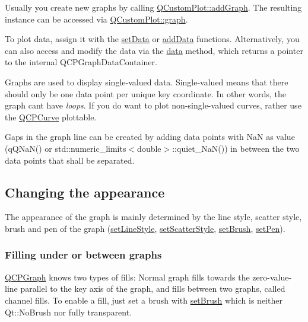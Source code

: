 Usually you create new graphs by calling \hyperlink{classQCustomPlot_a6fb2873d35a8a8089842d81a70a54167}{Q\+Custom\+Plot\+::add\+Graph}. The resulting instance can be accessed via \hyperlink{classQCustomPlot_a6ecae130f684b25276fb47bd3a5875c6}{Q\+Custom\+Plot\+::graph}.

To plot data, assign it with the \hyperlink{classQCPGraph_a1eae9429a316b008e2d99b2d65a54395}{set\+Data} or \hyperlink{classQCPGraph_ae0555c0d3fe0fa7cb8628f88158d420f}{add\+Data} functions. Alternatively, you can also access and modify the data via the \hyperlink{classQCPGraph_a141aa31a1f19bbd0ce60f55eaeb9ea60}{data} method, which returns a pointer to the internal Q\+C\+P\+Graph\+Data\+Container.

Graphs are used to display single-\/valued data. Single-\/valued means that there should only be one data point per unique key coordinate. In other words, the graph can\textquotesingle{}t have {\itshape loops}. If you do want to plot non-\/single-\/valued curves, rather use the \hyperlink{classQCPCurve}{Q\+C\+P\+Curve} plottable.

Gaps in the graph line can be created by adding data points with NaN as value ({\ttfamily q\+Q\+Na\+N()} or {\ttfamily std\+::numeric\+\_\+limits$<$double$>$\+::quiet\+\_\+\+Na\+N()}) in between the two data points that shall be separated.\hypertarget{classQCPGraph_qcpgraph-appearance}{}\subsection{Changing the appearance}\label{classQCPGraph_qcpgraph-appearance}
The appearance of the graph is mainly determined by the line style, scatter style, brush and pen of the graph (\hyperlink{classQCPGraph_a513fecccff5b2a50ce53f665338c60ff}{set\+Line\+Style}, \hyperlink{classQCPGraph_a12bd17a8ba21983163ec5d8f42a9fea5}{set\+Scatter\+Style}, \hyperlink{classQCPAbstractPlottable_a7a4b92144dca6453a1f0f210e27edc74}{set\+Brush}, \hyperlink{classQCPAbstractPlottable_ab74b09ae4c0e7e13142fe4b5bf46cac7}{set\+Pen}).\hypertarget{classQCPGraph_filling}{}\subsubsection{Filling under or between graphs}\label{classQCPGraph_filling}
\hyperlink{classQCPGraph}{Q\+C\+P\+Graph} knows two types of fills\+: Normal graph fills towards the zero-\/value-\/line parallel to the key axis of the graph, and fills between two graphs, called channel fills. To enable a fill, just set a brush with \hyperlink{classQCPAbstractPlottable_a7a4b92144dca6453a1f0f210e27edc74}{set\+Brush} which is neither Qt\+::\+No\+Brush nor fully transparent.

